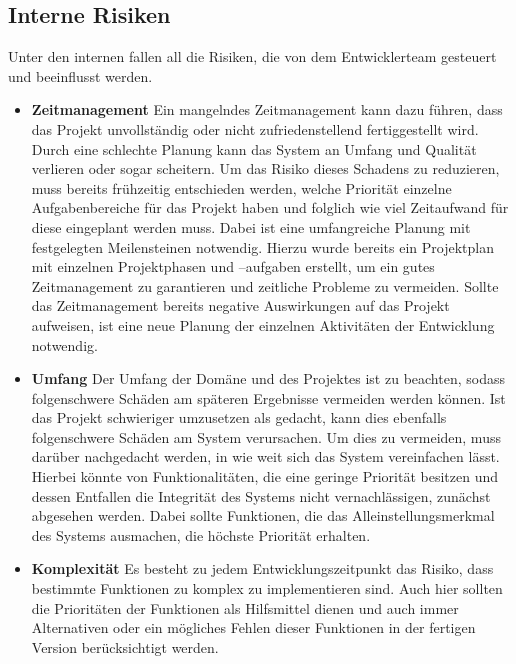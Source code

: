 \documentclass[a4paper,11pt]{article}%
\renewcommand{\\}{\vspace*{0.5\baselineskip} \newline}
\begin{document}
	\subsection{Interne Risiken}
		Unter den internen fallen all die Risiken, die von dem Entwicklerteam gesteuert und beeinflusst werden.
	\begin{itemize}
		\item \textbf{Zeitmanagement}\newline
		Ein mangelndes Zeitmanagement kann dazu führen, dass das Projekt unvollständig oder nicht zufriedenstellend fertiggestellt wird. Durch eine schlechte Planung kann das System an Umfang und Qualität verlieren oder sogar scheitern. Um das Risiko dieses Schadens zu reduzieren, muss bereits frühzeitig entschieden werden, welche Priorität einzelne Aufgabenbereiche für das Projekt haben und folglich wie viel Zeitaufwand für diese eingeplant werden muss. Dabei ist eine umfangreiche Planung mit festgelegten Meilensteinen notwendig. Hierzu wurde bereits ein Projektplan mit einzelnen Projektphasen und –aufgaben erstellt, um ein gutes Zeitmanagement zu garantieren und zeitliche Probleme zu vermeiden. Sollte das Zeitmanagement bereits negative Auswirkungen auf das Projekt aufweisen, ist eine neue Planung der einzelnen Aktivitäten der Entwicklung notwendig.
		\item \textbf{Umfang}\newline
		Der Umfang der Domäne und des Projektes ist zu beachten, sodass folgenschwere Schäden am späteren Ergebnisse vermeiden werden können. Ist das Projekt schwieriger umzusetzen als gedacht, kann dies ebenfalls folgenschwere Schäden am System verursachen. Um dies zu vermeiden, muss darüber nachgedacht werden, in wie weit sich das System vereinfachen lässt. Hierbei könnte von Funktionalitäten, die eine geringe Priorität besitzen und dessen Entfallen die Integrität des Systems nicht vernachlässigen, zunächst abgesehen werden. Dabei sollte Funktionen, die das Alleinstellungsmerkmal des Systems ausmachen, die höchste Priorität erhalten.
		\item \textbf{Komplexität} \newline
		Es besteht zu jedem Entwicklungszeitpunkt das Risiko, dass bestimmte Funktionen zu komplex zu implementieren sind. Auch hier sollten die Prioritäten der Funktionen als Hilfsmittel dienen und auch immer Alternativen oder ein mögliches Fehlen dieser Funktionen in der fertigen Version berücksichtigt werden.
	\end{itemize}
\end{document}
